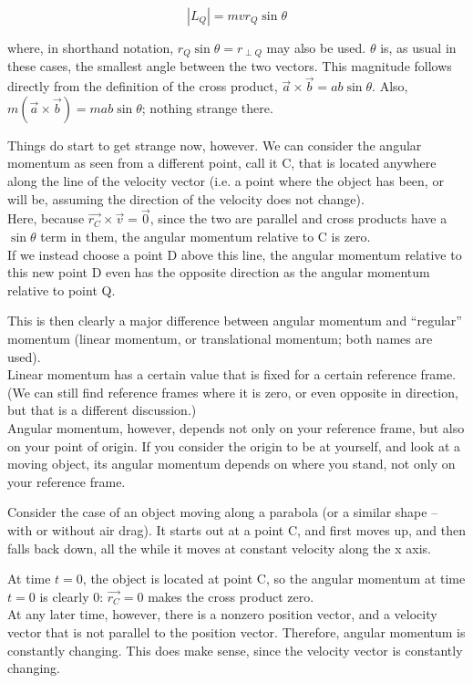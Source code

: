 \begin{equation}
|L_Q| = m v r_Q \sin \theta
\end{equation}

where, in shorthand notation, $r_Q \sin \theta = r_{\perp Q}$ may also be used. $\theta$ is, as usual in these cases, the smallest angle between the two vectors. This magnitude follows directly from the definition of the cross product, $\vec{a} \times \vec{b} = a b \sin \theta$. Also, $m(\vec{a} \times \vec{b}) = m a b \sin \theta$; nothing strange there.

Things do start to get strange now, however. We can consider the angular momentum as seen from a different point, call it C, that is located anywhere along the line of the velocity vector (i.e. a point where the object has been, or will be, assuming the direction of the velocity does not change).\\
Here, because $\vec{r_{C}} \times \vec{v} = \vec{0}$, since the two are parallel and cross products have a $\sin \theta$ term in them, the angular momentum relative to C is zero.\\
If we instead choose a point D above this line, the angular momentum relative to this new point D even has the opposite direction as the angular momentum relative to point Q.

This is then clearly a major difference between angular momentum and ``regular'' momentum (linear momentum, or translational momentum; both names are used).\\
Linear momentum has a certain value that is fixed for a certain reference frame. (We can still find reference frames where it is zero, or even opposite in direction, but that is a different discussion.)\\
Angular momentum, however, depends not only on your reference frame, but also on your point of origin. If you consider the origin to be at yourself, and look at a moving object, its angular momentum depends on where you stand, not only on your reference frame.

Consider the case of an object moving along a parabola (or a similar shape -- with or without air drag). It starts out at a point C, and first moves up, and then falls back down, all the while it moves at constant velocity along the x axis.

At time $t = 0$, the object is located at point C, so the angular momentum at time $t = 0$ is clearly 0: $\vec{r_C} = 0$ makes the cross product zero.\\
At any later time, however, there is a nonzero position vector, and a velocity vector that is not parallel to the position vector. Therefore, angular momentum is constantly changing. This does make sense, since the velocity vector is constantly changing.

